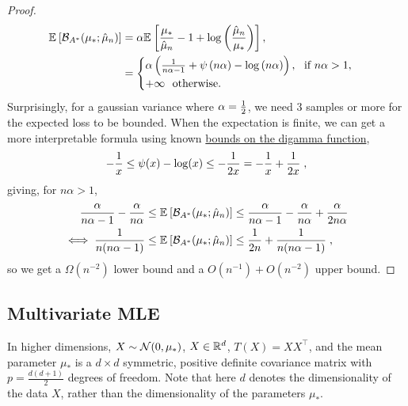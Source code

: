 \documentclass[twoside]{article}
\newcommand*{\expect}[2][]{\ensuremath{\mathbb{E}_{#1} \left[ #2 \right] }} %
\newcommand{\logpart}{A}
\newcommand{\bregmanconj}{\cB_{\logpart^*}}
\begin{document}
\begin{proof}
	\begin{align}
	\expect{\bregmanconj( \mu_*; \hat \mu_n) }
	&= \alpha \expect{\frac{\mu_*}{ \hat \mu_n} - 1 + \log \left(\frac{\hat \mu_n}{\mu_*} \right) },
	\\
	& =
	\begin{cases}
		\alpha \paren{ \frac{1}{n\alpha - 1} + \psi\paren{n \alpha} - \log\paren{n \alpha} }, \ \text{ if } n\alpha>1, \\
			+\infty \  \text{ otherwise. }
	\end{cases}
	\end{align}
	Surprisingly, for a gaussian variance where $\alpha = \frac{1}{2}$, we need $3$ samples or more for the expected loss to be bounded.
	When the expectation is finite, we can get a more interpretable formula using known \href{https://en.wikipedia.org/wiki/Digamma_function#Inequalities}{bounds on the digamma function},
	\begin{align}
		-\frac{1}{x} \leq \psi(x) - \log(x) \leq -\frac{1}{2x} = - \frac{1}{x} + \frac{1}{2x}	\; ,
	\end{align}
	giving, for $n \alpha >1 $,
	\begin{align}
		\frac{\alpha}{n\alpha-1} - \frac{\alpha}{n\alpha}
		&\leq \expect{\bregmanconj( \mu_*; \hat \mu_n) }
		\leq \frac{\alpha}{n\alpha-1} - \frac{\alpha}{n\alpha} + \frac{\alpha}{2n\alpha}
		\\
		\iff
			\frac{1}{n(n \alpha-1)}
			&\leq \expect{\bregmanconj( \mu_*; \hat \mu_n) }
			\leq \inv{2n} + \frac{1}{n(n \alpha-1)} \; ,
	\end{align}
	so we get a $\Omega(n^{-2})$ lower bound and a $O(n^{-1}) + O(n^{-2})$ upper bound.
	\end{proof}


\subsection{Multivariate MLE}

In higher dimensions, $X \sim {\mathcal N}(0, \mu_*)$, $X\in\mathbb{R}^d$, $T(X) = XX^\top$, and the mean parameter $\mu_*$ 
is a $d \times d$ symmetric, positive definite covariance matrix with $p = \frac{d(d+1)}{2}$ degrees of freedom.
Note that here $d$ denotes the dimensionality of the data $X$, rather than the dimensionality of the parameters $\mu_*$.
\end{document}
